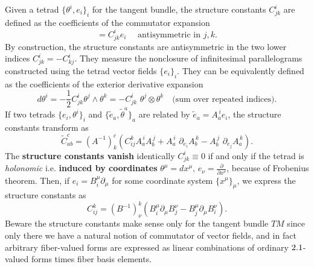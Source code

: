 \begin{mytheorem}
%
Given a tetrad $\{\theta^i,e_i\}_i$ for the tangent bundle, the structure constants $C^i_{jk}$ are defined as the coefficients of the commutator expansion
\begin{equation}
    [e_j, e_k] = C^i_{jk} e_i \,\, \quad \text{antisymmetric in $j,k$}.
\end{equation}
By construction, the structure constants are antisymmetric in the two lower indices $C^i_{jk} = - C^i_{kj}$.
They measure the nonclosure of infinitesimal parallelograms constructed using the tetrad vector fields $\{e_i\}_i$.
%
They can be equivalently defined as the coefficients of the exterior derivative expansion
\begin{equation}
    d \theta^i = - \frac{1}{2} C^i_{jk} \theta^j \wedge \theta^k = - C^i_{j k} \,\, \theta^j \otimes \theta^k \quad \text{(sum over repeated indices)}.
\end{equation}
%
If two tetrads $\{e_i,\theta^i\}_i$ and $\{\tilde{e}_a, \tilde{\theta}^a\}_a$ are related by $\tilde{e}_a = A_a^{\, i} e_i$, the structure constants transform as
\begin{equation}
    \tilde{C}^c_{ab} = (A^{-1})^c_k \left( C^k_{ij} A_a^{\, i} A_b^{\, j} + A_a^{\, i}\,\,\partial_{e_i} A_b^{\, k} - A_b^{\, j}\,\,\partial_{e_j} A_a^{\, k} \right).
\end{equation}
The \textbf{structure constants vanish} identically $C_{jk}^i \equiv 0$ if and only if the tetrad is \emph{holonomic} i.e. \textbf{induced by coordinates}  $\theta^\mu=dx^\mu,\,e_\nu=\frac{\partial}{\partial x^\nu}$, because of Frobenius theorem.
Then, if $e_i = B_i^\mu \partial_\mu$ for some coordinate system $\{x^\mu\}_\mu$, we express the structure constants as
\begin{equation}\label{eq:structure_constants_from_coordinates}
    C_{ij}^k= (B^{-1})^k_\nu \left( B_i^\mu \partial_\mu B_j^\nu - B_j^\mu \partial_\mu B_i^\nu \right).
\end{equation}
%
Beware the structure constants make sense only for the tangent bundle $TM$ since only there we have a natural notion of commutator of vector fields, and in fact arbitrary fiber-valued forms are expressed as linear combinations of ordinary $2.1$-valued forms times fiber basis elements.
\end{mytheorem}
